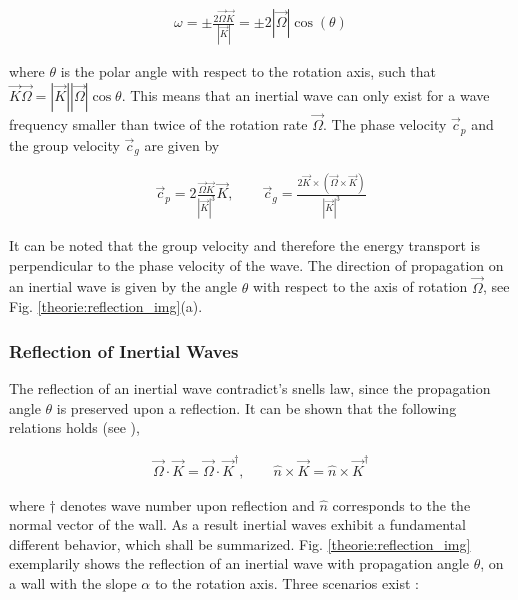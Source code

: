 \begin{align}
    \label{theorie:eq_rot_dispersion}
    \omega = \pm \frac{ 2\vec{\Omega}\vec{K}}{|\vec{K}|} = \pm 2|\vec{\Omega}|\cos(\theta)
\end{align}

where $\theta$ is the polar angle with respect to the rotation axis,
such that $\vec{K}\vec{\Omega} = |\vec{K}||\vec{\Omega}|\cos{\theta}$.
This means that an inertial wave can only exist for a wave frequency smaller than twice of the rotation rate $\vec{\Omega}$.
The phase velocity $\vec{c}_p$ and the group velocity $\vec{c}_g$ are given by

\begin{align}
    \vec{c}_p = 2 \frac{\vec{\Omega} \vec{K} }{|\vec{K}|^3} \vec{K}, \qquad
    \vec{c}_g = \frac{2 \vec{K} \times (\vec{\Omega} \times \vec{K})}{|\vec{K}|^3}
\end{align}

\clearpage


It can be noted that the group velocity and therefore the energy transport is perpendicular to the phase velocity of the wave.
The direction of propagation on an inertial wave is given by the angle $\theta$ with respect to the axis of rotation $\vec{\Omega}$,
see Fig. \ref{theorie:reflection_img}(a).


\subsubsection{Reflection of Inertial Waves}
\label{theorie:sec:iwreflec}

The reflection of an inertial wave contradict's snells law, since the propagation angle $\theta$ is preserved upon a reflection.
It can be shown that the following relations holds (see \cite{Beardsley1970}),

\begin{align}
\label{theorie:reflections}
\vec{\Omega}\cdot \vec{K} =  \vec{\Omega}\cdot\vec{K}^\dagger, \qquad \hat{n} \times \vec{K} = \hat{n} \times \vec{K}^\dagger
\end{align}

where $\dagger$ denotes wave number upon reflection and $\hat{n}$ corresponds to the the normal vector of the wall.
As a result inertial waves exhibit a fundamental different behavior, which shall be summarized.
Fig. \ref{theorie:reflection_img} exemplarily shows the reflection of an inertial wave with propagation angle $\theta$,
on a wall with the slope $\alpha$ to the rotation axis. Three scenarios exist \citep{Clausen2011}:

